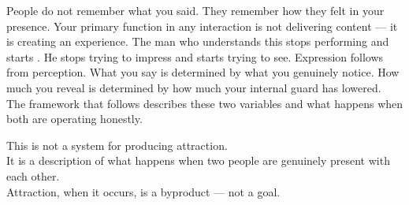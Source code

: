 People do not remember what you said. 
They remember how they felt in your presence.
Your primary function in any interaction is not delivering content --- it is 
creating an experience. The man who understands this stops performing and starts 
. He stops trying to impress and starts trying to see.
Expression follows from perception. What you say is determined 
by what you genuinely notice. 
How much you reveal is determined by how much your 
internal guard has lowered. The framework that follows 
describes these two variables and what happens when both are operating honestly.

\begin{calloutbox}
This is not a system for producing attraction.\\
It is a description of what happens when two people are genuinely present with each other.\\
Attraction, when it occurs, is a byproduct --- not a goal.
\end{calloutbox}
